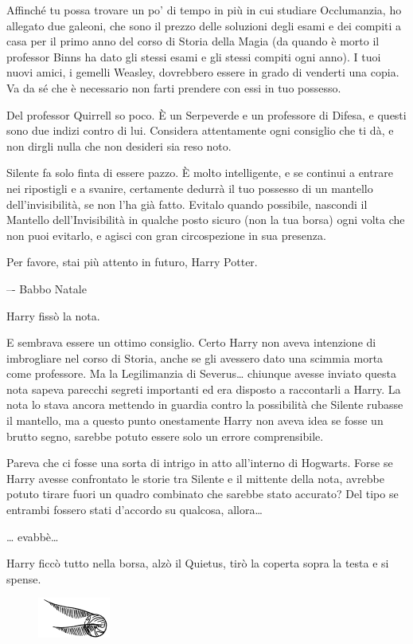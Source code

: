 Affinché tu possa trovare un po’ di tempo in più in cui studiare Occlumanzia, ho allegato due galeoni, che sono il prezzo delle soluzioni degli esami e dei compiti a casa per il primo anno del corso di Storia della Magia (da quando è morto il professor Binns ha dato gli stessi esami e gli stessi compiti ogni anno). I tuoi nuovi amici, i gemelli Weasley, dovrebbero essere in grado di venderti una copia. Va da sé che è necessario non farti prendere con essi in tuo possesso.

Del professor Quirrell so poco. È un Serpeverde e un professore di Difesa, e questi sono due indizi contro di lui. Considera attentamente ogni consiglio che ti dà, e non dirgli nulla che non desideri sia reso noto.

Silente fa solo finta di essere pazzo. È molto intelligente, e se continui a entrare nei ripostigli e a svanire, certamente dedurrà il tuo possesso di un mantello dell’invisibilità, se non l’ha già fatto. Evitalo quando possibile, nascondi il Mantello dell’Invisibilità in qualche posto sicuro (non la tua borsa) ogni volta che non puoi evitarlo, e agisci con gran circospezione in sua presenza.

Per favore, stai più attento in futuro, Harry Potter.

–- Babbo Natale

Harry fissò la nota.

E sembrava essere un ottimo consiglio. Certo Harry non aveva intenzione di imbrogliare nel corso di Storia, anche se gli avessero dato una scimmia morta come professore. Ma la Legilimanzia di Severus… chiunque avesse inviato questa nota sapeva parecchi segreti importanti ed era disposto a raccontarli a Harry. La nota lo stava ancora mettendo in guardia contro la possibilità che Silente rubasse il mantello, ma a questo punto onestamente Harry non aveva idea se fosse un brutto segno, sarebbe potuto essere solo un errore comprensibile.

Pareva che ci fosse una sorta di intrigo in atto all’interno di Hogwarts. Forse se Harry avesse confrontato le storie tra Silente e il mittente della nota, avrebbe potuto tirare fuori un quadro combinato che sarebbe stato accurato? Del tipo se entrambi fossero stati d’accordo su qualcosa, allora…

… evabbè…

Harry ficcò tutto nella borsa, alzò il Quietus, tirò la coperta sopra la testa e si spense.

\begin{figure}[h!]
        \includegraphics[scale=0.4]{boccino.png}
        \centering
\end{figure}

